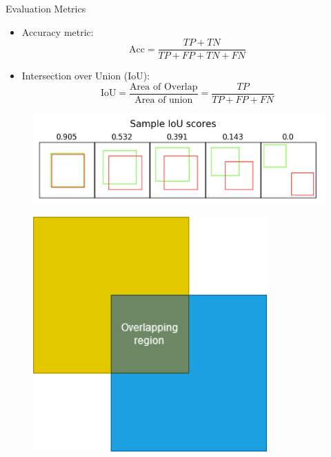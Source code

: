 \documentclass{beamer}
\begin{document}
\begin{frame}{Evaluation Metrics}
\begin{minipage}{\textwidth}
    \begin{minipage}{0.6\textwidth}
        \begin{itemize}
            \item Accuracy metric:
                \begin{equation*}
                    \text{Acc} = \frac{TP + TN}{TP + FP + TN + FN}
                \end{equation*}
            \item Intersection over Union (IoU):
                \begin{equation*}
                    \text{IoU} = \frac{\text{Area of Overlap}}{\text{Area of union}} = \frac{TP}{TP+FP+FN}
                \end{equation*}
        \end{itemize}
        
    \end{minipage}
    \hfill
    \begin{minipage}{0.38\textwidth}
        \begin{figure}
            \centering
            \includegraphics[width = \textwidth]{img/iou_scores.png}
        \end{figure}
        \begin{figure}
            \centering
            \includegraphics[width = 0.8\textwidth]{img/IoU.drawio.png}
        \end{figure}

    \end{minipage}
\end{minipage}
\end{frame}
\end{document}
